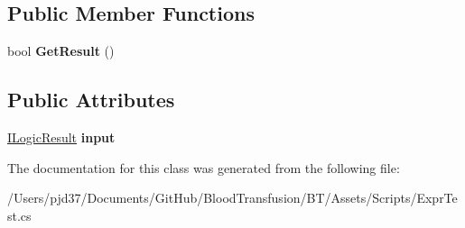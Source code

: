 \subsection*{Public Member Functions}
\begin{DoxyCompactItemize}
\item 
bool {\bfseries Get\+Result} ()\hypertarget{class_b83_1_1_logic_expression_parser_1_1_combine_not_a6fd9cc22b208fa90678d9892c2382185}{}\label{class_b83_1_1_logic_expression_parser_1_1_combine_not_a6fd9cc22b208fa90678d9892c2382185}

\end{DoxyCompactItemize}
\subsection*{Public Attributes}
\begin{DoxyCompactItemize}
\item 
\hyperlink{interface_b83_1_1_logic_expression_parser_1_1_i_logic_result}{I\+Logic\+Result} {\bfseries input}\hypertarget{class_b83_1_1_logic_expression_parser_1_1_combine_not_ad9d454db466343baf3054a70880f937e}{}\label{class_b83_1_1_logic_expression_parser_1_1_combine_not_ad9d454db466343baf3054a70880f937e}

\end{DoxyCompactItemize}


The documentation for this class was generated from the following file\+:\begin{DoxyCompactItemize}
\item 
/\+Users/pjd37/\+Documents/\+Git\+Hub/\+Blood\+Transfusion/\+B\+T/\+Assets/\+Scripts/Expr\+Test.\+cs\end{DoxyCompactItemize}
